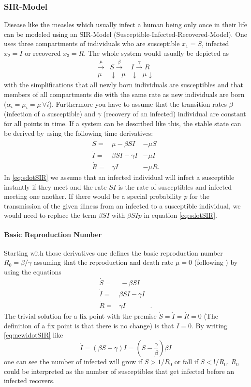 \subsubsection{SIR-Model}
Disease like the measles which usually infect a human being only once in their life can be modeled using an SIR-Model (Susceptible-Infected-Recovered-Model). One uses three compartments of individuals who are susceptible $x_1 = S$, infected $x_2=I$ or recovered $x_3=R$. The whole system would usually be depicted as 
\begin{eqnarray}
\xrightarrow{\mu} &S \xrightarrow{\beta} &I  \xrightarrow{\gamma} R  \\
{\mu} & \downarrow \text{         }\mu &\downarrow \text{  } {\mu} \downarrow \nonumber
\end{eqnarray}
with the simplifications that all newly born individuals are susceptibles and that members of all compartments die with the same rate as new individuals are born ($\alpha_i = \mu_i = \mu\, \forall i$). Furthermore you have to assume that the transition rates $\beta$ (infection of a susceptible) and $\gamma$ (recovery of an infected) individual are constant for all points in time.
If a system can be described like this, the stable state can be derived by using the following time derivatives:
\begin{eqnarray}
\dot{S} =& \mu -\beta SI &-  \mu S  \label{eq:sdotSIR}\\ 
\dot{I} =& \beta SI - \gamma I  &-\mu I \\
\dot{R} =& \gamma I & -\mu R.
\end{eqnarray}
In \ref{eq:sdotSIR} we assume that an infected individual will infect a susceptible instantly if they meet and the rate $SI$ is the rate of susceptibles and infected meeting one another. If there would be a special probability $p$ for the transmission of the given illness from an infected to a susceptible individual, we would need to replace the term $\beta SI$ with $\beta S I p$ in equation \ref{eq:sdotSIR}.
\paragraph{Basic Reproduction Number}
Starting with those derivatives one defines the basic reproduction number $R_0=\beta / \gamma$ assuming that the reproduction and death rate $\mu=0$ (following \citep{AND92}) by using the equations
\begin{eqnarray}
\dot{S} =& \ -\beta SI &  \label{eq:newsdotSIR}\\ 
\dot{I} =& \beta SI - \gamma I  & \label{eq:newidotSIR}\\
\dot{R} =& \gamma I &.
\end{eqnarray}
The trivial solution for a fix point with the premise $\dot{S} = \dot{I} =\dot{R} = 0$ (The definition of a fix point is that there is no change) is that $I=0$. By writing \ref{eq:newidotSIR} like 
\begin{equation}
\dot{I} = (\beta S -\gamma) I = \left( S-\frac{\gamma}{\beta} \right) \beta I
\end{equation}
one can see the number of infected will grow if $S > 1/R_0$ or fall if $S < !/R_0$. $R_0$ could be interpreted as the number of susceptibles that get infected before an infected recovers.
